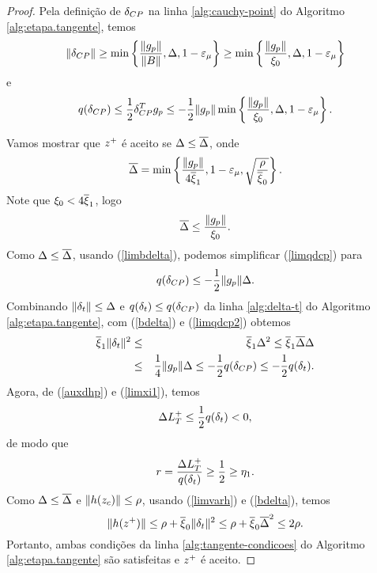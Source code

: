 \begin{proof}
Pela defini\c{c}\~ao de $\delta_{CP}$ na linha \ref{alg:cauchy-point} do Algoritmo
\ref{alg:etapa.tangente}, temos $$\Vert \delta_{CP}\Vert \geq
\min\left\{\frac{\Vert g_p\Vert}{\Vert B\Vert},\Delta,1-\varepsilon_{\mu} \right\} \geq
\min\left\{\frac{\Vert g_p\Vert}{\xi_0}, \Delta, 1 - \varepsilon_{\mu} \right\}$$ e
\begin{equation}\visiblelbl{limqdcp} q(\dcp) \leq \meio\dcp^Tg_p \leq
-\meio\norma{g_p}\min\left\{ \frac{\norma{g_p}}{\xi_0}, \Delta, 1 - \epsmu
\right\}.  \end{equation}

Vamos mostrar que $z^{+}$ \'e aceito se $\Delta \leq \overline{\Delta}$, onde
\begin{equation}\visiblelbl{bdelta} \barra{\Delta} =
\min\left\{\frac{\norma{g_p}}{4\bxi_1}, 1-\epsmu, \sqrt{\frac{\rho}
{\bxi_0}}\right\}.  \end{equation} Note que $\xi_0 < 4\overline{\xi}_1$, logo
\begin{equation}\visiblelbl{limbdelta} \barra{\Delta} \leq
\frac{\norma{g_p}}{\xi_0}.  \end{equation} Como $\Delta \leq \overline{\Delta}$,
usando (\ref{limbdelta}), podemos simplificar (\ref{limqdcp}) para
\begin{equation}\visiblelbl{limqdcp2} 
  q(\dcp) \leq -\meio\norma{g_p}\Delta.
\end{equation}
Combinando $\Vert \delta_t\Vert \leq \Delta$ e $q(\delta_t) \leq q(\delta_{CP})$ da linha
\ref{alg:delta-t} do Algoritmo \ref{alg:etapa.tangente}, com (\ref{bdelta}) e
(\ref{limqdcp2}) obtemos 
\begin{eqnarray} 
  \bxi_1\norma{\dt}^2 & \leq & \bxi_1\Delta^2 \leq \bxi_1\barra{\Delta}\Delta
  \nonumber \\ 
  & \leq & \frac{1}{4}\norma{g_p}\Delta \leq -\meio q(\dcp) \leq -\meio q(\dt).
\visiblelbl{limxi1} 
\end{eqnarray} 
Agora, de (\ref{auxdhp}) e (\ref{limxi1}),
temos \begin{equation}\visiblelbl{negDHp} \DHp \leq \meio q(\dt) < 0,
\end{equation} de modo que 
\begin{equation}\visiblelbl{rgeqeta1} 
  r = \frac{\DHp}{q(\dt)} \geq \meio \geq \eta_1.  
\end{equation}
Como $\Delta \leq \overline{\Delta}$ e $\Vert h(z_c)\Vert \leq \rho$, usando
(\ref{limvarh}) e (\ref{bdelta}), temos $$\Vert h(z^{+})\Vert \leq \rho + \overline{\xi}_0
\Vert \delta_t\Vert^2 \leq \rho + \overline{\xi}_0\overline{\Delta}^2 \leq 2 \rho.$$ Portanto, ambas
condi\c{c}\~oes da linha \ref{alg:tangente-condicoes} do Algoritmo
\ref{alg:etapa.tangente} s\~ao satisfeitas e $z^{+}$ \'e aceito.


\end{proof}
